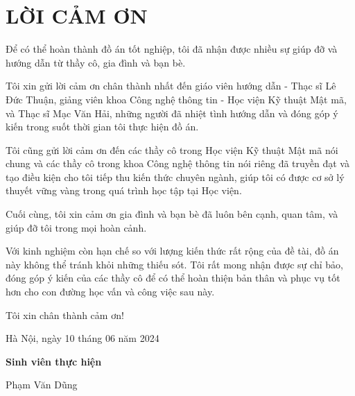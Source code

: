 
\cleardoublepage
{}
{}
\chapter*{LỜI CẢM ƠN}

Để có thể hoàn thành đồ án tốt nghiệp, tôi đã nhận được nhiều sự giúp đỡ và hướng dẫn từ thầy cô, gia đình và bạn bè.

Tôi xin gửi lời cảm ơn chân thành nhất đến giáo viên hướng dẫn - Thạc sĩ Lê Đức Thuận, giảng viên khoa Công nghệ thông tin - Học viện Kỹ thuật Mật mã, và Thạc sĩ Mạc Văn Hải, những người đã nhiệt tình hướng dẫn và đóng góp ý kiến trong suốt thời gian tôi thực hiện đồ án.

Tôi cũng gửi lời cảm ơn đến các thầy cô trong Học viện Kỹ thuật Mật mã nói chung và các thầy cô trong khoa Công nghệ thông tin nói riêng đã truyền đạt và tạo điều kiện cho tôi tiếp thu kiến thức chuyên ngành, giúp tôi có được cơ sở lý thuyết vững vàng trong quá trình học tập tại Học viện.

Cuối cùng, tôi xin cảm ơn gia đình và bạn bè đã luôn bên cạnh, quan tâm, và giúp đỡ tôi trong mọi hoàn cảnh.

Với kinh nghiệm còn hạn chế so với lượng kiến thức rất rộng của đề tài, đồ án này không thể tránh khỏi những thiếu sót. Tôi rất mong nhận được sự chỉ bảo, đóng góp ý kiến của các thầy cô để có thể hoàn thiện bản thân và phục vụ tốt hơn cho con đường học vấn và công việc sau này.

Tôi xin chân thành cảm ơn!

\begin{flushleft}        
	\hspace{8cm}
	Hà Nội, ngày 10 tháng 06 năm 2024
	
	\hspace{9.5cm}
	\textbf{Sinh viên thực hiện}
	
	\vspace {2cm}
	
	\hspace{10cm}
	Phạm Văn Dũng
	
	\vfill	
\end{flushleft}